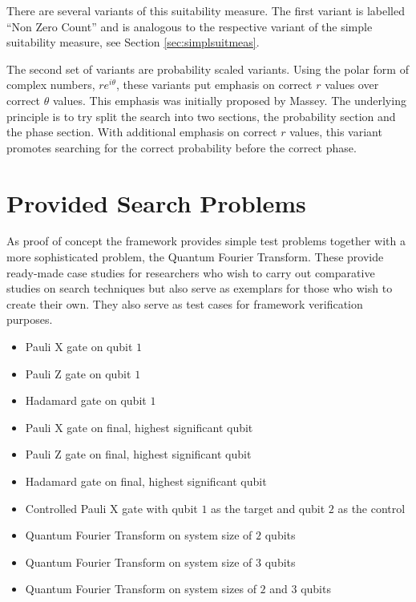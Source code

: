 There are several variants of this suitability measure.
The first variant is labelled ``Non Zero Count'' and is analogous to the respective variant of the simple suitability measure, see Section \ref{sec:simplsuitmeas}.

The second set of variants are probability scaled variants.
Using the polar form of complex numbers, $re^{i\theta}$, these variants put emphasis on correct $r$ values over correct $\theta$ values.
This emphasis was initially proposed by Massey\cite{masseythesis}.
The underlying principle is to try split the search into two sections, the probability section and the phase section.
With additional emphasis on correct $r$ values, this variant promotes searching for the correct probability before the correct phase.

\section{Provided Search Problems}
\label{sec:provsearchprobs}
As proof of concept the framework provides simple test problems together with a more sophisticated problem, the Quantum Fourier Transform.
These provide ready-made case studies for researchers who wish to carry out comparative studies on search techniques but also serve as exemplars for those who wish to create their own.
They also serve as test cases for framework verification purposes.
\begin{itemize}
 \item Pauli X gate on qubit $1$
 \item Pauli Z gate on qubit $1$
 \item Hadamard gate on qubit $1$
 \item Pauli X gate on final, highest significant qubit
 \item Pauli Z gate on final, highest significant qubit
 \item Hadamard gate on final, highest significant qubit
 \item Controlled Pauli X gate with qubit $1$ as the target and qubit $2$ as the control
 \item Quantum Fourier Transform on system size of $2$ qubits
 \item Quantum Fourier Transform on system size of $3$ qubits
 \item Quantum Fourier Transform on system sizes of $2$ and $3$ qubits
\end{itemize}

